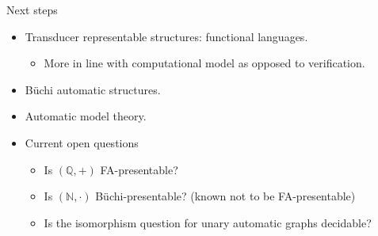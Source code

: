 \documentclass[style=fyma
 ]{powerdot}
\begin{document}
\begin{slide}{Next steps}
  \begin{itemize}
    \item Transducer representable structures: functional languages.  
      \begin{itemize}
        \item[] More in line with computational model as opposed to verification.
      \end{itemize}
      
      \medskip
      
    \item B\"uchi automatic structures.  %
    
    \medskip
    
    \item Automatic model theory.  %
    
   \medskip
    
    \item Current open questions 
      \begin{itemize}
    	\item Is $(\mathbb{Q}, +)$ FA-presentable?
	\item Is $(\mathbb{N}, \cdot)$ B\"uchi-presentable? (known not to be FA-presentable)
	\item Is the isomorphism question for unary automatic graphs decidable?
      \end{itemize}
  \end{itemize}
\end{slide}
\end{document}
